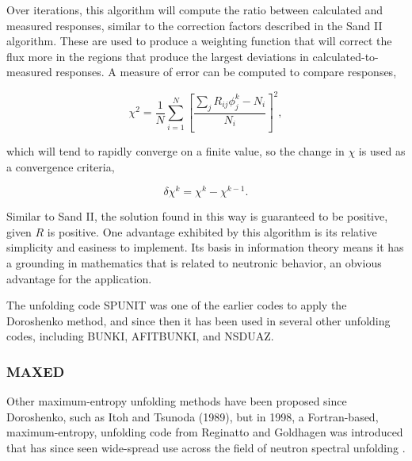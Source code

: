 Over iterations, this algorithm will compute the ratio between calculated and measured responses, similar to the correction factors described in the Sand II algorithm.
These are used to produce a weighting function that will correct the flux more in the regions that produce the largest deviations in calculated-to-measured responses.
A measure of error can be computed to compare responses,

\begin{equation}
\label{eqn:doroshenko-error}
\chi^2 = \frac{1}{N} \sum_{i=1}^N [\frac{\sum_j R_{ij} \phi_j^k - N_i}{N_i}]^2 ,
\end{equation}

\noindent
which will tend to rapidly converge on a finite value, so the change in $\chi$ is used as a convergence criteria,

\begin{equation}
\label{eqn:doroshenko-error-delta}
\delta \chi^k = \chi^k - \chi^{k-1} .
\end{equation}

\noindent
Similar to Sand II, the solution found in this way is guaranteed to be positive, given $R$ is positive.
One advantage exhibited by this algorithm is its relative simplicity and easiness to implement.
Its basis in information theory means it has a grounding in mathematics that is related to neutronic behavior, an obvious advantage for the application.

The unfolding code SPUNIT was one of the earlier codes to apply the Doroshenko method, and since then it has been used in several other unfolding codes, including BUNKI, AFITBUNKI, and NSDUAZ.




\subsubsection{MAXED}

Other maximum-entropy unfolding methods have been proposed since Doroshenko, such as Itoh and Tsunoda (1989), but in 1998, a Fortran-based, maximum-entropy, unfolding code from Reginatto and Goldhagen was introduced that has since seen wide-spread use across the field of neutron spectral unfolding \cite{reginatto1999maxed}.

